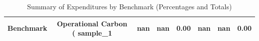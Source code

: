 \begin{table}[h]
\centering
\begin{tabular}{c|ccc|ccc}
\hline
Benchmark & Operational Carbon (%
\hline
sample_1 & nan & nan & 0.00 & nan & nan & 0.00 \\
\hline
\end{tabular}
\caption{Summary of Expenditures by Benchmark (Percentages and Totals)}
\label{tab:benchmarks_summary}
\end{table}